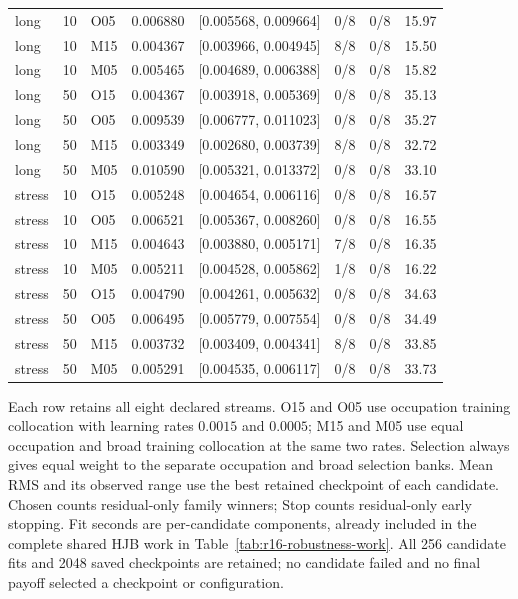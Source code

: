 \begin{longtable}{lrlrlrrr}
long & 10 & O05 & 0.006880 & [0.005568, 0.009664] & 0/8 & 0/8 & 15.97 \\
long & 10 & M15 & 0.004367 & [0.003966, 0.004945] & 8/8 & 0/8 & 15.50 \\
long & 10 & M05 & 0.005465 & [0.004689, 0.006388] & 0/8 & 0/8 & 15.82 \\
long & 50 & O15 & 0.004367 & [0.003918, 0.005369] & 0/8 & 0/8 & 35.13 \\
long & 50 & O05 & 0.009539 & [0.006777, 0.011023] & 0/8 & 0/8 & 35.27 \\
long & 50 & M15 & 0.003349 & [0.002680, 0.003739] & 8/8 & 0/8 & 32.72 \\
long & 50 & M05 & 0.010590 & [0.005321, 0.013372] & 0/8 & 0/8 & 33.10 \\
stress & 10 & O15 & 0.005248 & [0.004654, 0.006116] & 0/8 & 0/8 & 16.57 \\
stress & 10 & O05 & 0.006521 & [0.005367, 0.008260] & 0/8 & 0/8 & 16.55 \\
stress & 10 & M15 & 0.004643 & [0.003880, 0.005171] & 7/8 & 0/8 & 16.35 \\
stress & 10 & M05 & 0.005211 & [0.004528, 0.005862] & 1/8 & 0/8 & 16.22 \\
stress & 50 & O15 & 0.004790 & [0.004261, 0.005632] & 0/8 & 0/8 & 34.63 \\
stress & 50 & O05 & 0.006495 & [0.005779, 0.007554] & 0/8 & 0/8 & 34.49 \\
stress & 50 & M15 & 0.003732 & [0.003409, 0.004341] & 8/8 & 0/8 & 33.85 \\
stress & 50 & M05 & 0.005291 & [0.004535, 0.006117] & 0/8 & 0/8 & 33.73 \\
\bottomrule
\end{longtable}
\par\medskip\noindent\footnotesize Each row retains all eight declared streams. O15 and O05 use occupation training collocation with learning rates $0.0015$ and $0.0005$; M15 and M05 use equal occupation and broad training collocation at the same two rates. Selection always gives equal weight to the separate occupation and broad selection banks. Mean RMS and its observed range use the best retained checkpoint of each candidate. Chosen counts residual-only family winners; Stop counts residual-only early stopping. Fit seconds are per-candidate components, already included in the complete shared HJB work in Table~\ref{tab:r16-robustness-work}. All 256 candidate fits and 2048 saved checkpoints are retained; no candidate failed and no final payoff selected a checkpoint or configuration.
